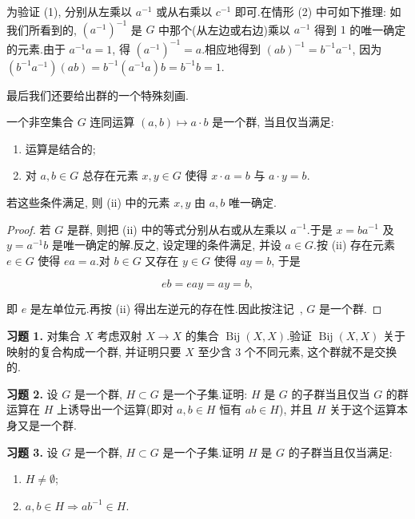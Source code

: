 为验证 (1), 分别从左乘以 $a^{-1}$ 或从右乘以 $c^{-1}$ 即可.在情形 (2) 中可如下推理: 如我们所看到的, $(a^{-1})^{-1}$ 是 $G$ 中那个(从左边或右边)乘以 $a^{-1}$ 得到 $1$ 的唯一确定的元素.由于 $a^{-1} a = 1$, 得 $(a^{-1})^{-1} = a$.相应地得到 $(ab)^{-1} = b^{-1} a^{-1}$, 因为 $(b^{-1} a^{-1})(ab) = b^{-1}(a^{-1} a) b = b^{-1} b = 1$.

最后我们还要给出群的一个特殊刻画.

\begin{theorem}[群的刻画]\label{thm:1.2.4}
一个非空集合 $G$ 连同运算 $(a, b) \longmapsto a \cdot b$ 是一个群, 当且仅当满足:
\begin{enumerate}
\item[(i)] 运算是结合的;
\item[(ii)] 对 $a, b \in G$ 总存在元素 $x, y \in G$ 使得 $x \cdot a = b$ 与 $a \cdot y = b$.
\end{enumerate}
若这些条件满足, 则 (ii) 中的元素 $x, y$ 由 $a, b$ 唯一确定.
\end{theorem}

\begin{proof}
若 $G$ 是群, 则把 (ii) 中的等式分别从右或从左乘以 $a^{-1}$.于是 $x = ba^{-1}$ 及 $y = a^{-1}b$ 是唯一确定的解.反之, 设定理的条件满足, 并设 $a \in G$.按 (ii) 存在元素 $e \in G$ 使得 $ea = a$.对 $b \in G$ 又存在 $y \in G$ 使得 $ay = b$, 于是

\[
eb = eay = ay = b,
\]

即 $e$ 是左单位元.再按 (ii) 得出左逆元的存在性.因此按注记~, $G$ 是一个群.
\end{proof}

\aufgaben

\noindent\textbf{习题 1.} 对集合 $X$ 考虑双射 $X \longrightarrow X$ 的集合 $\operatorname{Bij}(X, X)$.验证 $\operatorname{Bij}(X, X)$ 关于映射的复合构成一个群, 并证明只要 $X$ 至少含 $3$ 个不同元素, 这个群就不是交换的.

\medskip
\noindent\textbf{习题 2.} 设 $G$ 是一个群, $H \subset G$ 是一个子集.证明: $H$ 是 $G$ 的子群当且仅当 $G$ 的群运算在 $H$ 上诱导出一个运算(即对 $a, b \in H$ 恒有 $ab \in H$), 并且 $H$ 关于这个运算本身又是一个群.

\medskip
\noindent\textbf{习题 3.} 设 $G$ 是一个群, $H \subset G$ 是一个子集.证明 $H$ 是 $G$ 的子群当且仅当满足:
\begin{enumerate}
\item[(i)] $H \neq \emptyset$;
\item[(ii)] $a, b \in H \Longrightarrow ab^{-1} \in H$.
\end{enumerate}

